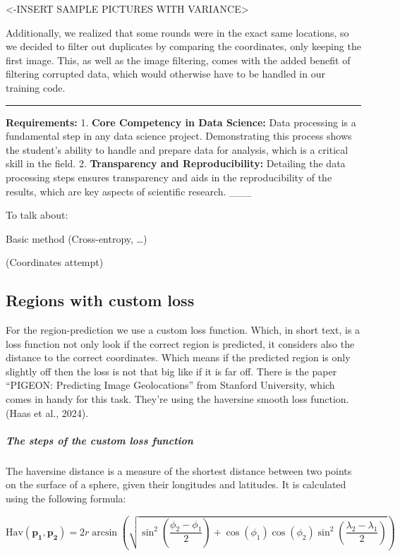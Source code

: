 \documentclass{article}
\begin{document}
\textless-INSERT SAMPLE PICTURES WITH VARIANCE\textgreater{}

Additionally, we realized that some rounds were in the exact same
locations, so we decided to filter out duplicates by comparing the
coordinates, only keeping the first image. This, as well as the image
filtering, comes with the added benefit of filtering corrupted data,
which would otherwise have to be handled in our training code.

\begin{center}\rule{0.5\linewidth}{0.5pt}\end{center}

\textbf{Requirements:} 1. \textbf{Core Competency in Data Science:} Data
processing is a fundamental step in any data science project.
Demonstrating this process shows the student's ability to handle and
prepare data for analysis, which is a critical skill in the field. 2.
\textbf{Transparency and Reproducibility:} Detailing the data processing
steps ensures transparency and aids in the reproducibility of the
results, which are key aspects of scientific research. \_\_\_

To talk about:

Basic method (Cross-entropy, \ldots)

(Coordinates attempt)

\subsection{Regions with custom loss}\label{regions-with-custom-loss}

For the region-prediction we use a custom loss function. Which, in short
text, is a loss function not only look if the correct region is
predicted, it considers also the distance to the correct coordinates.
Which means if the predicted region is only slightly off then the loss
is not that big like if it is far off. There is the paper ``PIGEON:
Predicting Image Geolocations'' from Stanford University, which comes in
handy for this task. They're using the haversine smooth loss function.
(Haas et al., 2024).

\subparagraph{The steps of the custom loss
function}\label{the-steps-of-the-custom-loss-function}

The haversine distance is a measure of the shortest distance between two
points on the surface of a sphere, given their longitudes and latitudes.
It is calculated using the following formula:

\[
\text{Hav}(\mathbf{p_1}, \mathbf{p_2}) = 2r \arcsin \left( \sqrt{\sin^2 \left( \frac{\phi_2 - \phi_1}{2} \right) + \cos(\phi_1) \cos(\phi_2) \sin^2 \left( \frac{\lambda_2 - \lambda_1}{2} \right)} \right) 
\]
\end{document}

